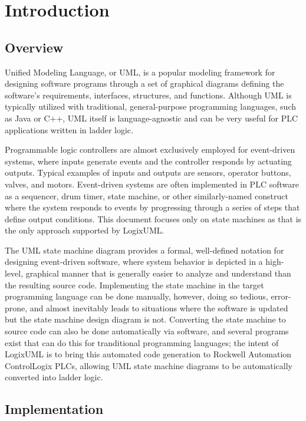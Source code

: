 \section{Introduction}


\subsection{Overview}

Unified Modeling Language, or UML, is a popular modeling framework for designing
software programs through a set of graphical diagrams defining
the software's requirements, interfaces, structures, and functions.
Although UML is typically utilized with traditional,
general-purpose programming languages, such as Java or C++, UML itself
is language-agnostic and can be very useful for PLC applications written in
ladder logic.

Programmable logic controllers are almost exclusively employed for
event-driven systems, where inputs generate events and the controller responds
by actuating outputs. Typical examples of inputs and outputs are sensors,
operator buttons, valves, and motors. Event-driven systems are often
implemented in PLC software as a sequencer, drum timer, state machine,
or other similarly-named construct where the system responds to events by
progressing through a series of steps that define output conditions.
This document focuses only on state machines as that is the only approach
supported by LogixUML.

The UML state machine diagram provides a formal, well-defined notation for
designing event-driven software, where system behavior is depicted in a
high-level, graphical manner that is generally easier to analyze and understand
than the resulting source code. Implementing the state machine in the
target programming language can be done manually, however, doing so tedious,
error-prone, and almost inevitably leads to situations where the software
is updated but the state machine design diagram is not. Converting the
state machine to source code can also be done automatically via software, and 
several programs exist that can do this for tranditional programming
languages; the intent of LogixUML is to bring this automated code generation
to Rockwell Automation ControlLogix PLCs, allowing UML state machine diagrams
to be automatically converted into ladder logic.


\subsection{Implementation}

